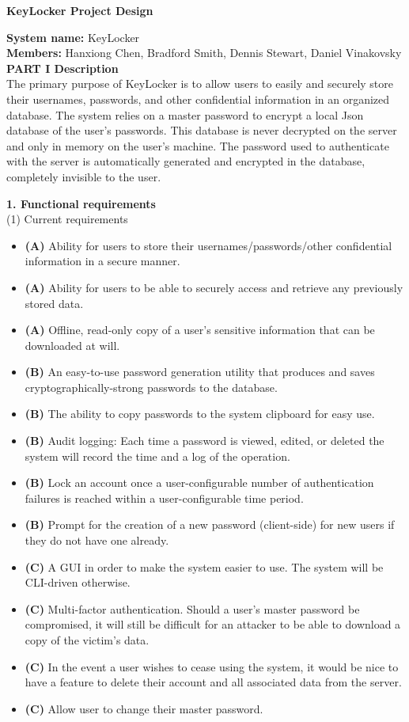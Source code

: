 \documentclass[11pt, letterpaper]{article}
\newcommand{\DesignSection}[1]
{\noindent\textbf{#1}\\}
\begin{document}
\centerline{\textbf{KeyLocker Project Design}}
\smallskip
\noindent\textbf{System name: }KeyLocker\\
\noindent\textbf{Members: }Hanxiong Chen, Bradford Smith, Dennis Stewart, Daniel Vinakovsky\\

\DesignSection{PART I Description}
\noindent
The primary purpose of KeyLocker is to allow users to easily and securely store their usernames, passwords, and other confidential information in an organized database. The system relies on a master password to encrypt a local Json database of the user's passwords. This database is never decrypted on the server and only in memory on the user's machine. The password used to authenticate with the server is automatically generated and encrypted in the database, completely invisible to the user.

\DesignSection{1. Functional requirements}
\smallskip
\noindent(1) Current requirements
\begin{itemize} \itemsep1pt \parskip0pt 
    \item \textbf{(A) }Ability for users to store their usernames/passwords/other confidential information in a secure manner.
    \item \textbf{(A) }Ability for users to be able to securely access and retrieve any previously stored data.
    \item \textbf{(A) }Offline, read-only copy of a user's sensitive information that can be downloaded at will.
    \item \textbf{(B) }An easy-to-use password generation utility that produces and saves cryptographically-strong passwords to the database.
    \item \textbf{(B) }The ability to copy passwords to the system clipboard for easy use.
    \item \textbf{(B) }Audit logging: Each time a password is viewed, edited, or deleted the system will record the time and a log of the operation.
    \item \textbf{(B) }Lock an account once a user-configurable number of authentication failures is reached within a user-configurable time period.
    \item \textbf{(B) }Prompt for the creation of a new password (client-side) for new users if they do not have one already.
    \item \textbf{(C) }A \ac{GUI} in order to make the system easier to use. The system will be \ac{CLI}-driven otherwise.
    \item \textbf{(C) }Multi-factor authentication. Should a user's master password be compromised, it will still be difficult for an attacker to be able to download a copy of the victim's data.
    \item \textbf{(C) }In the event a user wishes to cease using the system, it would be nice to have a feature to delete their account and all associated data from the server.
    \item \textbf{(C) }Allow user to change their master password.
\end{itemize}
\smallskip
\end{document}
